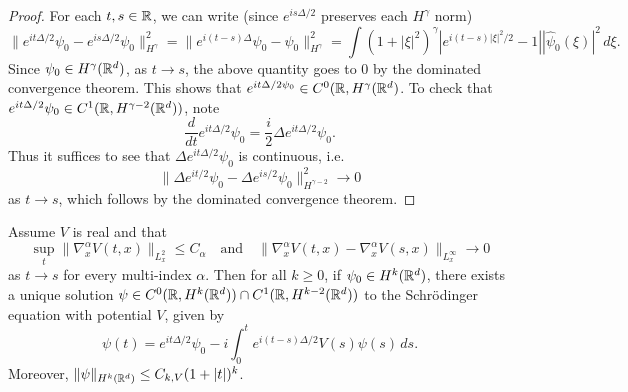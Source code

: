 \begin{proof}
  For each $t, s \in \mathbb{R}$, we can write (since
  $e^{is\Delta / 2}$ preserves each $H^\gamma$ norm)
  \[
    \|e^{it\Delta / 2} \psi_0 - e^{is\Delta / 2} \psi_0\|_{H^\gamma}^2
    = \|e^{i(t - s)\Delta} \psi_0 - \psi_0\|_{H^\gamma}^2
    = \int (1 + |\xi|^2)^{\gamma} |e^{i(t - s)|\xi|^2 / 2} - 1| |\widehat{\psi}_0(\xi)|^2\, d\xi.
  \]
  Since $\psi_0 \in H^\gamma(\mathbb{R}^d)$,
  as $t \to s$, the above quantity goes to $0$
  by the dominated convergence theorem. This shows that
  $e^{it\Delta / 2 \psi_0} \in C^0(\mathbb{R}, H^\gamma(\mathbb{R}^d)$.
  To check that $e^{it\Delta / 2} \psi_0 \in C^1(\mathbb{R}, H^{\gamma - 2}(\mathbb{R}^d))$, note
  \[
    \frac{d}{dt} e^{it\Delta / 2} \psi_0
    = \frac{i}{2} \Delta e^{it\Delta / 2} \psi_0.
  \]
  Thus it suffices to see that $\Delta e^{it\Delta / 2} \psi_0$ is continuous, i.e.
  \[
    \|\Delta e^{it / 2} \psi_0 - \Delta e^{is / 2} \psi_0\|_{H^{\gamma - 2}}^2 \to 0
  \]
  as $t \to s$, which follows by the dominated
  convergence theorem.
\end{proof}

\begin{theorem}
  Assume $V$ is real and that
  \[
    \sup_{t} \|\nabla_x^\alpha V(t, x) \|_{L^2_x} \le C_\alpha
    \quad \text{and} \quad
    \|\nabla_x^\alpha V(t, x) - \nabla_x^\alpha V(s, x)\|_{L^\infty_x} \to 0
  \]
  as $t \to s$ for every multi-index $\alpha$.
  Then for all $k \ge 0$, if $\psi_0 \in H^k(\mathbb{R}^d)$,
  there exists a unique solution
  $\psi \in C^0(\mathbb{R}, H^k(\mathbb{R}^d)) \cap C^1(\mathbb{R}, H^{k - 2}(\mathbb{R}^d))$
  to the Schr\"odinger equation with potential $V$,
  given by
  \[
    \psi(t) = e^{it\Delta / 2} \psi_0 - i \int_0^t e^{i(t - s)\Delta / 2} V(s) \psi(s)\, ds.
  \]
  Moreover, $\|\psi\|_{H^k(\mathbb{R}^d)} \le C_{k, V} (1 + |t|)^k$.
\end{theorem}

